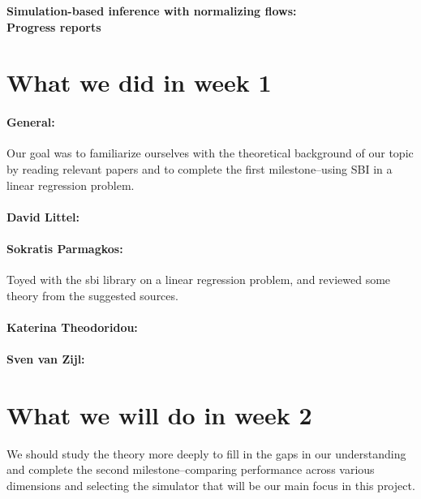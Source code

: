 \documentclass{article}
\begin{document}
\begin{center}{\Large \textbf{
    Simulation-based inference with normalizing flows:\\
    Progress reports
    }}
\end{center}

\section*{What we did in week 1}

\paragraph{General:}
Our goal was to familiarize ourselves with the theoretical background of our topic by reading relevant papers and to complete the first milestone--using SBI in a linear regression problem.
\paragraph{David Littel:}

\paragraph{Sokratis Parmagkos:}
Toyed with the sbi library on a linear regression problem, and reviewed some theory from the suggested sources.
\paragraph{Katerina Theodoridou:}

\paragraph{Sven van Zijl:}

\section*{What we will do in week 2}
We should study the theory more deeply to fill in the gaps in our understanding and complete the second milestone--comparing performance across various dimensions and selecting the simulator that will be our main focus in this project.
\end{document}
